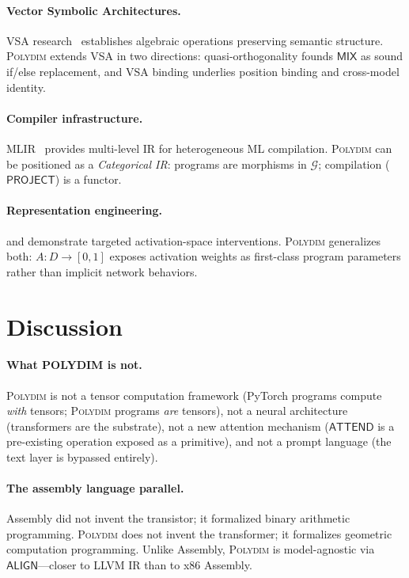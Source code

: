 \documentclass[10pt,twocolumn]{article}
\theoremstyle{plain}
\theoremstyle{definition}
\theoremstyle{remark}
\newcommand{\Mix}{\mathsf{MIX}}
\newcommand{\Project}{\mathsf{PROJECT}}
\newcommand{\Attend}{\mathsf{ATTEND}}
\newcommand{\Align}{\mathsf{ALIGN}}
\begin{document}
\paragraph{Vector Symbolic Architectures.}
VSA research~\citep{plate1995,kanerva2009,frady2021} establishes algebraic
operations preserving semantic structure. \textsc{Polydim} extends VSA in two
directions: quasi-orthogonality founds $\Mix$ as sound if/else replacement, and
VSA binding underlies position binding and cross-model identity.

\paragraph{Compiler infrastructure.}
MLIR~\citep{lattner2021mlir} provides multi-level IR for heterogeneous ML
compilation. \textsc{Polydim} can be positioned as a \emph{Categorical IR}:
programs are morphisms in $\mathcal{G}$; compilation ($\Project$) is a functor.

\paragraph{Representation engineering.}
\citet{turner2023activation} and \citet{zou2023representation} demonstrate
targeted activation-space interventions. \textsc{Polydim} generalizes both:
$A\colon D \to [0,1]$ exposes activation weights as first-class program
parameters rather than implicit network behaviors.

\section{Discussion}
\label{sec:discussion}

\paragraph{What POLYDIM is not.}
\textsc{Polydim} is not a tensor computation framework (PyTorch programs compute
\emph{with} tensors; \textsc{Polydim} programs \emph{are} tensors), not a neural
architecture (transformers are the substrate), not a new attention mechanism
($\Attend$ is a pre-existing operation exposed as a primitive), and not a prompt
language (the text layer is bypassed entirely).

\paragraph{The assembly language parallel.}
Assembly did not invent the transistor; it formalized binary arithmetic
programming. \textsc{Polydim} does not invent the transformer; it formalizes
geometric computation programming. Unlike Assembly, \textsc{Polydim} is
model-agnostic via $\Align$---closer to LLVM IR than to x86 Assembly.
\end{document}
